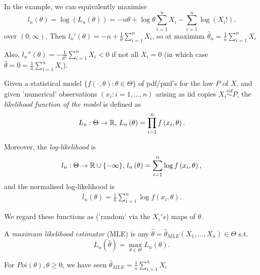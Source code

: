 \documentclass[a4paper]{article}
\begin{document}
In the example, we can equivalently maximise 
\[
	l_{n}\left( \theta \right) = \log\left( L_{n}\left( \theta \right)  \right) = -n\theta + \log\theta \sum_{i=1}^{n} X_{i}  - \sum_{i=1}^{n} \log\left( X_{i}! \right)
.\]
over $(0, \infty)$. Then  $l_{n}'\left( \theta \right) = -n + \frac{1}{\theta}\sum_{i=1}^{n} X_{i}$, so at maximum $\hat{\theta}_{n} = \frac{1}{n} \sum_{i=1}^{n} X_{i}$

Also, $l_{n}''\left( \theta \right) = - \frac{1}{\theta ^2} \sum_{i=1}^{n} X_{i} < 0$ if not all $X_{i} = 0$ (in which case $\hat{\theta} = 0 = \frac{1}{n} \sum_{i=1}^{n} X_{i}$).

\newpage

\begin{defn}
Given a statistical model $\{f\left( \cdot , \theta \right): \theta \in \Theta \} $ of pdf/pmf's for the law $P$ of $X$, and given 'numerical' observations  $\left( x_{i}: i=1,\ldots,n \right) $ arising as iid copies $X_{i}\stackrel{iid}{\sim}P$, the \textit{likelihood function of the model} is defined as
	\begin{align*}
		L_{n} : \Theta \to \mathbb{R} \text{, } L_{n}\left( \theta \right) = \prod_{i=1}^{n} f\left( x_{i}, \theta \right)   
	.\end{align*}

Moreover, the \textit{log-likelihood} is
\begin{align*}
	l_{n}: \Theta \to \mathbb{R} \cup \{-\infty\} \text{, } l_{n}\left( \theta \right) = \sum_{i=1}^{n}\log f\left( x_{i}, \theta \right)
,\end{align*}
and the normalised log-likelihood is
\begin{align*}
	\overline{l}_{n}\left( \theta \right) = \frac{1}{n}\sum_{i=1}^{n}\log f\left( x_{i}, \theta \right) 
.\end{align*}
\end{defn}
We regard these functions as ('random' via the $X_{i}'s$) maps of $\theta$.

\begin{defn}
	A \textit{maximum likelihood estimator} (MLE) is any $\hat{\theta} = \hat{\theta}_{MLE} \left( X_{1}, \ldots, X_{n} \right) \in \Theta$ s.t. \[
		L_{n}( \hat{\theta}) = \max_{\theta \in \Theta} L_{n}\left( \theta \right) 
	.\] 
\end{defn}

\begin{eg}
	For $Poi(\theta), \theta \ge 0$, we have seen $\hat{\theta}_{MLE} = \frac{1}{n} \sum_{i=1}^{n} X_{i}$
\end{eg}
\end{document}
